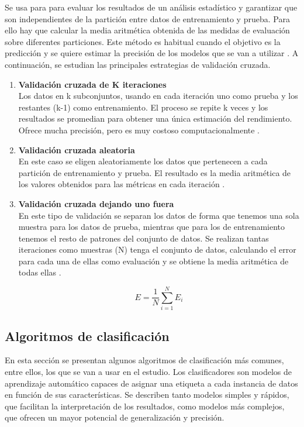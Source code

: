 \vspace{1em}

Se usa para para evaluar los resultados de un análisis estadístico y garantizar que son independientes de la partición entre datos de entrenamiento y prueba. Para ello hay que calcular la media aritmética obtenida de las medidas de evaluación sobre diferentes particiones. Este método es habitual cuando el objetivo es la predicción y se quiere estimar la precisión de los modelos que se van a utilizar \cite{crossval}. A continuación, se estudian las principales estrategias de validación cruzada.

\begin{enumerate}
	\item \textbf{Validación cruzada de K iteraciones} \\
		Los datos en k subconjuntos, usando en cada iteración uno como prueba y los restantes (k-1) como entrenamiento. El proceso se repite k veces y los resultados se promedian para obtener una única estimación del rendimiento. Ofrece mucha precisión, pero es muy costoso computacionalmente \cite{crossval1}.
	\item \textbf{Validación cruzada aleatoria} \\
		En este caso se eligen aleatoriamente los datos que pertenecen a cada partición de entrenamiento y prueba. El resultado es la media aritmética de los valores obtenidos para las métricas en cada iteración \cite{crossval2}.
	\item \textbf{Validación cruzada dejando uno fuera} \\
		En este tipo de validación se separan los datos de forma que tenemos una sola muestra para los datos de prueba, mientras que para los de entrenamiento tenemos el resto de patrones del conjunto de datos. Se realizan tantas iteraciones como muestras (N) tenga el conjunto de datos, calculando el error para cada una de ellas como evaluación y se obtiene la media aritmética de todas ellas \cite{crossval3}.

		\[
			E = \frac{1}{N} \sum_{i=1}^{N} E_{i}
		\]
\end{enumerate}

\subsection{Algoritmos de clasificación}
\label{subsec:clasificacion}

En esta sección se presentan algunos algoritmos de clasificación más comunes, entre ellos, los que se van a usar en el estudio. Los clasificadores son modelos de aprendizaje automático capaces de asignar una etiqueta a cada instancia de datos en función de sus características. Se describen tanto modelos simples y rápidos, que facilitan la interpretación de los resultados, como modelos más complejos, que ofrecen un mayor potencial de generalización y precisión.

